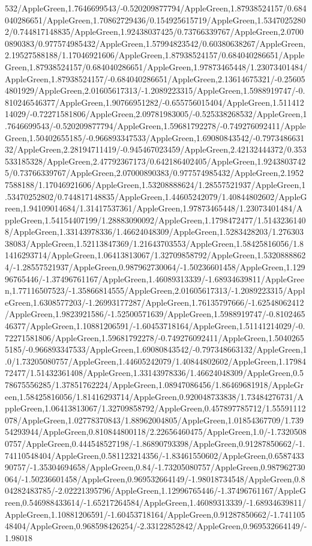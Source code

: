 {\begin{tikzternal}
532/AppleGreen,1.7646699543/-0.520209877794/AppleGreen,1.87938524157/0.684040286651/AppleGreen,1.70862729436/0.154925615719/AppleGreen,1.53470252802/0.744817148835/AppleGreen,1.92438037425/0.73766339767/AppleGreen,2.07000890383/0.977574985432/AppleGreen,1.57994823542/0.60380638267/AppleGreen,2.19527588188/1.17046921606/AppleGreen,1.87938524157/0.684040286651/AppleGreen,1.87938524157/0.684040286651/AppleGreen,1.97873465448/1.23073401484/AppleGreen,1.87938524157/-0.684040286651/AppleGreen,2.13614675321/-0.256054801929/AppleGreen,2.01605617313/-1.2089223315/AppleGreen,1.5988919747/-0.810246546377/AppleGreen,1.90766951282/-0.655756015404/AppleGreen,1.51141214029/-0.72271581806/AppleGreen,2.09781983005/-0.525338268532/AppleGreen,1.7646699543/-0.520209877794/AppleGreen,1.59681792278/-0.749276092411/AppleGreen,1.50402655185/-0.966893347533/AppleGreen,1.69080843542/-0.797348663132/AppleGreen,2.28194711419/-0.945467023459/AppleGreen,2.42132444372/0.353533185328/AppleGreen,2.47792367173/0.642186402405/AppleGreen,1.92438037425/0.73766339767/AppleGreen,2.07000890383/0.977574985432/AppleGreen,2.19527588188/1.17046921606/AppleGreen,1.53208888624/1.28557521937/AppleGreen,1.53470252802/0.744817148835/AppleGreen,1.44605242079/1.40844802602/AppleGreen,1.94109014684/1.31417537361/AppleGreen,1.97873465448/1.23073401484/AppleGreen,1.54154407199/1.28883090092/AppleGreen,1.1798472477/1.51432361408/AppleGreen,1.33143978336/1.46624048309/AppleGreen,1.5283428203/1.27630338083/AppleGreen,1.52113847369/1.21643703553/AppleGreen,1.58425816056/1.81416293714/AppleGreen,1.06413813067/1.32709858792/AppleGreen,1.53208888624/-1.28557521937/AppleGreen,0.987962730064/-1.50236601458/AppleGreen,1.12996765446/-1.37496761167/AppleGreen,1.46089313339/-1.68934639811/AppleGreen,1.77116507523/-1.35866814555/AppleGreen,2.01605617313/-1.2089223315/AppleGreen,1.6308577203/-1.26993177287/AppleGreen,1.76135797666/-1.62548062412/AppleGreen,1.9823921586/-1.52500571639/AppleGreen,1.5988919747/-0.810246546377/AppleGreen,1.10881206591/-1.60453718164/AppleGreen,1.51141214029/-0.72271581806/AppleGreen,1.59681792278/-0.749276092411/AppleGreen,1.50402655185/-0.966893347533/AppleGreen,1.69080843542/-0.797348663132/AppleGreen,1.0/1.73205080757/AppleGreen,1.44605242079/1.40844802602/AppleGreen,1.1798472477/1.51432361408/AppleGreen,1.33143978336/1.46624048309/AppleGreen,0.578675556285/1.37851762224/AppleGreen,1.08947086456/1.86469681918/AppleGreen,1.58425816056/1.81416293714/AppleGreen,0.920048733838/1.73484276731/AppleGreen,1.06413813067/1.32709858792/AppleGreen,0.457897785712/1.55591112078/AppleGreen,1.02778370843/1.88962004805/AppleGreen,1.01854367709/1.73954293944/AppleGreen,0.810844800118/2.22656460475/AppleGreen,1.0/-1.73205080757/AppleGreen,0.444548527198/-1.86890793398/AppleGreen,0.91287850662/-1.74110548404/AppleGreen,0.581123214356/-1.83461550602/AppleGreen,0.658743390757/-1.35304694658/AppleGreen,0.84/-1.73205080757/AppleGreen,0.987962730064/-1.50236601458/AppleGreen,0.969532664149/-1.98018734548/AppleGreen,0.804282483785/-2.02221395796/AppleGreen,1.12996765446/-1.37496761167/AppleGreen,0.546988433614/-1.65217264584/AppleGreen,1.46089313339/-1.68934639811/AppleGreen,1.10881206591/-1.60453718164/AppleGreen,0.91287850662/-1.74110548404/AppleGreen,0.968598426254/-2.33122852842/AppleGreen,0.969532664149/-1.98018
\end{tikzternal}}
